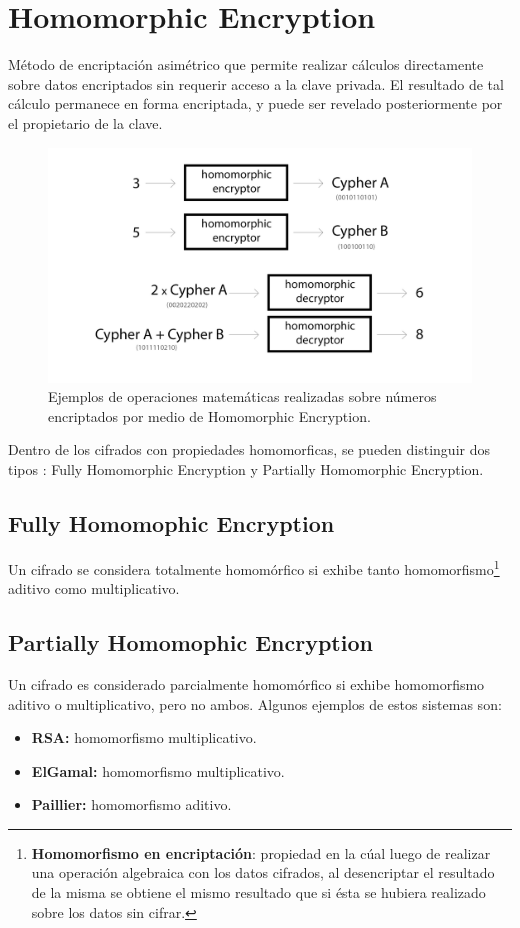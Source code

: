 \documentclass[
11pt, %
oneside, %
spanish, %
singlespacing, %
parskip, %
headsepline, %
chapterinoneline, %
]{MastersDoctoralThesis} %
\begin{document}
\pagebreak

\section{Homomorphic Encryption}\label{section-he}
\cite{homenc} Método de encriptación asimétrico que permite realizar cálculos directamente sobre datos encriptados sin requerir acceso a la clave privada. El resultado de tal cálculo permanece en forma encriptada, y puede ser revelado posteriormente por el propietario de la clave.

\begin{figure}[H]
  	\centering
	\includegraphics[scale=0.5]{imgs/he.png}
	\caption{\cite{he} Ejemplos de operaciones matemáticas realizadas sobre números encriptados por medio de Homomorphic Encryption.}
\end{figure}

Dentro de los cifrados con propiedades homomorficas, se pueden distinguir dos tipos \cite{homenc1} \cite{homenc2}: Fully Homomorphic Encryption y Partially Homomorphic Encryption.

\subsection*{Fully Homomophic Encryption}
Un cifrado se considera totalmente homomórfico si exhibe tanto homomorfismo\footnote{\textbf{Homomorfismo en encriptación}: propiedad en la cúal luego de realizar una operación algebraica con los datos cifrados, al desencriptar el resultado de la misma se obtiene el mismo resultado que si ésta se hubiera realizado sobre los datos sin cifrar.} aditivo como multiplicativo.

\subsection*{Partially Homomophic Encryption}
Un cifrado es considerado parcialmente homomórfico si exhibe homomorfismo aditivo o multiplicativo, pero no ambos. Algunos ejemplos de estos sistemas son:
\begin{itemize}
\item \textbf{RSA:} homomorfismo multiplicativo. 
\item \textbf{ElGamal:} homomorfismo multiplicativo.
\item \textbf{Paillier:} homomorfismo aditivo.
\end{itemize}
\end{document}
